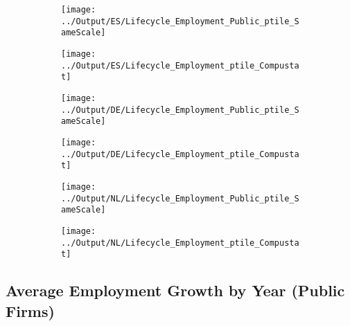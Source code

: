 \documentclass[12pt,notitlepage]{article}
\begin{document}
\begin{figure}[!htpb]
\centering
\begin{subfigure}{.49\textwidth}
    \centering
 \texttt{[image: ../Output/ES/Lifecycle\_Employment\_Public\_ptile\_SameScale]}
\end{subfigure}%
\begin{subfigure}{.49\textwidth}
    \centering
 \texttt{[image: ../Output/ES/Lifecycle\_Employment\_ptile\_Compustat]}
\end{subfigure}
\begin{subfigure}{.49\textwidth}
    \centering
 \texttt{[image: ../Output/DE/Lifecycle\_Employment\_Public\_ptile\_SameScale]}
\end{subfigure}%
\begin{subfigure}{.49\textwidth}
    \centering
 \texttt{[image: ../Output/DE/Lifecycle\_Employment\_ptile\_Compustat]}
\end{subfigure}
\begin{subfigure}{.49\textwidth}
    \centering
 \texttt{[image: ../Output/NL/Lifecycle\_Employment\_Public\_ptile\_SameScale]}
\end{subfigure}%
\begin{subfigure}{.49\textwidth}
    \centering
 \texttt{[image: ../Output/NL/Lifecycle\_Employment\_ptile\_Compustat]}
\end{subfigure}
\end{figure}
\pagebreak

\subsection{Average Employment Growth by Year (Public Firms)}
\end{document}
